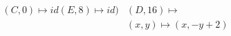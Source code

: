 \documentclass[preview]{standalone}
\begin{document}
\begin{align*}
(C,0) \mapsto id (E,8) \mapsto id) &(D,16) \mapsto \\& (x,y) \mapsto (x, -y + 2)
\end{align*}
\end{document}
